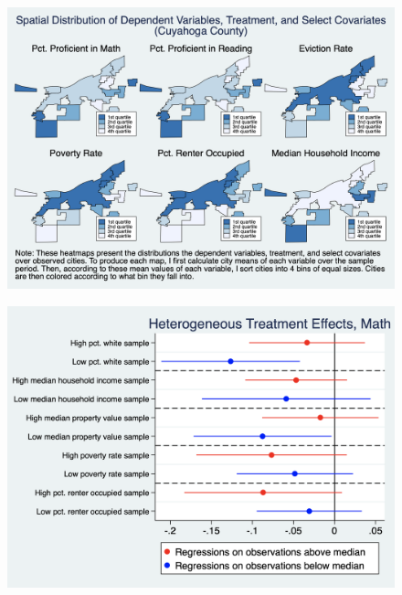 \documentclass[12pt]{article}
\begin{document}
\begin{landscape}
\begin{figure}
    \centering
    \includegraphics[scale=0.5]{output/graphs/maps.png}
    \caption{}
    \label{fig:my_label}
\end{figure}
\end{landscape}

\begin{landscape}
\begin{figure}
    \centering
    \includegraphics[scale=0.5]{output/graphs/math_heterogeneous_effects.png}
    \caption{}
    \label{fig:my_label}
\end{figure}
\end{landscape}
\end{document}

